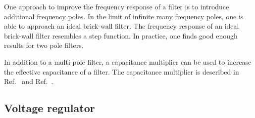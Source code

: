 One approach to improve the frequency response of a filter is to introduce additional frequency poles.
In the limit of infinite many frequency poles, one is able to approach an ideal brick-wall filter.
The frequency response of an ideal brick-wall filter resembles a step function.
In practice, one finds good enough results for two pole filters.

In addition to a multi-pole filter, a capacitance multiplier can be used to increase the effective capacitance of a filter.
The capacitance multiplier is described in Ref.~\cite[p.~536]{Hobbs11} and Ref.~\cite[p.~578]{Horowitz15}.

\subsection{Voltage regulator}

